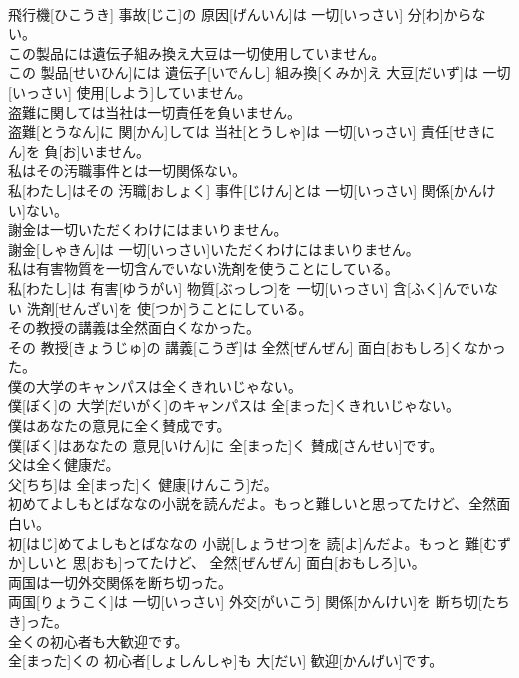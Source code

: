 \documentclass[8pt]{extreport}
\begin{document}
\begin{CJK}{UTF8}{min}
\\	飛行機[ひこうき] 事故[じこ]の 原因[げんいん]は 一切[いっさい] 分[わ]からない。
\\	この製品には遺伝子組み換え大豆は一切使用していません。	
\\	この 製品[せいひん]には 遺伝子[いでんし] 組み換[くみか]え 大豆[だいず]は 一切[いっさい] 使用[しよう]していません。
\\	盗難に関しては当社は一切責任を負いません。	
\\	盗難[とうなん]に 関[かん]しては 当社[とうしゃ]は 一切[いっさい] 責任[せきにん]を 負[お]いません。
\\	私はその汚職事件とは一切関係ない。	
\\	私[わたし]はその 汚職[おしょく] 事件[じけん]とは 一切[いっさい] 関係[かんけい]ない。
\\	謝金は一切いただくわけにはまいりません。	
\\	謝金[しゃきん]は 一切[いっさい]いただくわけにはまいりません。
\\	私は有害物質を一切含んでいない洗剤を使うことにしている。	
\\	私[わたし]は 有害[ゆうがい] 物質[ぶっしつ]を 一切[いっさい] 含[ふく]んでいない 洗剤[せんざい]を 使[つか]うことにしている。
\\	その教授の講義は全然面白くなかった。	
\\	その 教授[きょうじゅ]の 講義[こうぎ]は 全然[ぜんぜん] 面白[おもしろ]くなかった。
\\	僕の大学のキャンパスは全くきれいじゃない。	
\\	僕[ぼく]の 大学[だいがく]のキャンパスは 全[まった]くきれいじゃない。
\\	僕はあなたの意見に全く賛成です。	
\\	僕[ぼく]はあなたの 意見[いけん]に 全[まった]く 賛成[さんせい]です。
\\	父は全く健康だ。	
\\	父[ちち]は 全[まった]く 健康[けんこう]だ。
\\	初めてよしもとばななの小説を読んだよ。もっと難しいと思ってたけど、全然面白い。	
\\	初[はじ]めてよしもとばななの 小説[しょうせつ]を 読[よ]んだよ。もっと 難[むずか]しいと 思[おも]ってたけど、 全然[ぜんぜん] 面白[おもしろ]い。
\\	両国は一切外交関係を断ち切った。	
\\	両国[りょうこく]は 一切[いっさい] 外交[がいこう] 関係[かんけい]を 断ち切[たちき]った。
\\	全くの初心者も大歓迎です。	
\\	全[まった]くの 初心者[しょしんしゃ]も 大[だい] 歓迎[かんげい]です。

\end{CJK}
\end{document}
